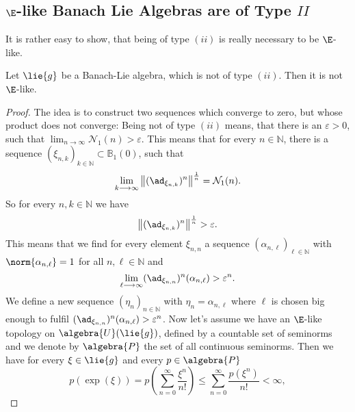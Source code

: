 \documentclass[
11pt,                          %
english                        %
]{article}
\begin{document}
\subsection{$\E$-like Banach Lie Algebras are of Type $II$}
It is rather easy to show, that being of type $(ii)$ is really necessary to be 
$\E$-like.
\begin{proposition}
	Let $\lie{g}$ be a Banach-Lie algebra, which is not of type $(ii)$. Then it is 
	not $\E$-like.
\end{proposition}
\begin{proof}
	The idea is to construct two sequences which converge to zero, but whose 
	product does not converge: Being not of type $(ii)$ means, that there is an
	$\varepsilon > 0$, such that $\lim_{n \rightarrow \infty} \mathcal{N}_1(n) > 
	\varepsilon$. This means that for every $n \in \mathbb{N}$, there is a sequence 
	$\left(\xi_{n, k} \right)_{k \in \mathbb{N}} \subset \mathbb{B}_1(0)$, 
	such that
	\begin{equation*}
		\lim_{k \longrightarrow \infty}
		\left\Vert
			(\ad_{\xi_{n, k}})^n
		\right\Vert^{\frac{1}{n}}
		=
		\mathcal{N}_1(n).
	\end{equation*}
	So for every $n, k \in \mathbb{N}$ we have
	\begin{equation*}
		\left\Vert
			(\ad_{\xi_{n, k}})^n
		\right\Vert^{\frac{1}{n}}
		> \varepsilon.
	\end{equation*}
	This means that we find for every element $\xi_{n,n}$ a sequence 
	$(\alpha_{n, \ell})_{\ell \in \mathbb{N}}$ with $\norm{\alpha_{n, \ell}} = 1$ 
	for all $n, \ell \in \mathbb{N}$ and
	\begin{equation*}
		\lim_{\ell \longrightarrow \infty}
		(\ad_{\xi_{n,n}})^n(\alpha_{n,\ell})
		> 
		\varepsilon^n.
	\end{equation*}
	We define a new sequence $(\eta_n)_{n \in \mathbb{N}}$ with 
	$\eta_n = \alpha_{n, \ell}$ where $\ell$ is chosen big enough to 
	fulfil $(\ad_{\xi_{n,n}})^n(\alpha_{n,\ell}) > \varepsilon^n$.
	Now let's assume we have an $\E$-like topology on $\algebra{U}(\lie{g})$, 
	defined by a countable set of seminorms and we denote by $\algebra{P}$ the set 
	of all continuous seminorms. Then we have for every $\xi \in \lie{g}$ and every 
	$p \in \algebra{P}$
	\begin{equation*}
		p \left( \exp(\xi) \right)
		=
		p \left(
			\sum\limits_{n=0}^\infty
			\frac{\xi^n}{n!}
		\right)
		\leq
		\sum\limits_{n=0}^\infty
		\frac{p\left( \xi^n \right)}{n!}
		<
		\infty,
	\end{equation*}

\end{proof}
\end{document}
